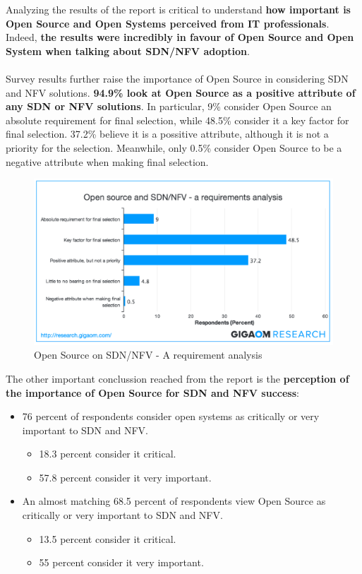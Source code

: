 \documentclass[a4paper, 12pt]{book}
\begin{document}
Analyzing the results of the report is critical to understand \textbf{how important is Open Source and Open Systems perceived from IT professionals}. Indeed, \textbf{the results were incredibly in favour of Open Source and Open System when talking about SDN/NFV adoption}.\\
\\
Survey results further raise the importance of Open Source in considering SDN and NFV solutions. \textbf{94.9\% look at Open Source as a positive attribute of any SDN or NFV solutions}. In particular, 9\% consider Open Source an absolute requirement for final selection, while 48.5\% consider it a key factor for final selection. 37.2\% believe it is a possitive attribute, although it is not a priority for the selection. Meanwhile, only 0.5\% consider Open Source to be a negative attribute when making final selection.
\begin{center}
 \begin{figure}[H]
 \begin{center}
   \includegraphics[width=15cm]{img/open-source-requirement-operator-view-00.png}
   \caption{Open Source on SDN/NFV - A requirement analysis}
   \label{fig:sdn_hype_cyle}
 \end{center}
 \end{figure}
\end{center}
The other important conclussion reached from the report is the \textbf{perception of the importance of Open Source for SDN and NFV success}:
\begin{itemize}\itemsep0pt
\item{76 percent of respondents consider open systems as critically or very important to SDN and NFV}.
\begin{itemize}\itemsep0pt
\item{18.3 percent consider it critical.}
\item{57.8 percent consider it very important.}
\end{itemize}
\item{An almost matching 68.5 percent of respondents view Open Source as critically or very important to SDN and NFV}.
\begin{itemize}\itemsep0pt
\item{13.5 percent consider it critical.}
\item{55 percent consider it very important.}
\end{itemize}
\end{itemize}
\end{document}
